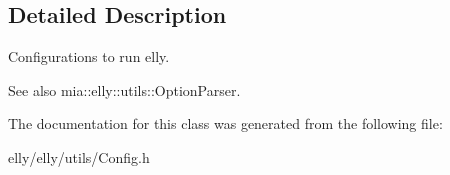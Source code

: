 \subsection{Detailed Description}
Configurations to run elly. \begin{DoxySeeAlso}{See also}
mia\-::elly\-::utils\-::\-Option\-Parser. 
\end{DoxySeeAlso}


The documentation for this class was generated from the following file\-:\begin{DoxyCompactItemize}
\item 
elly/elly/utils/Config.\-h\end{DoxyCompactItemize}

